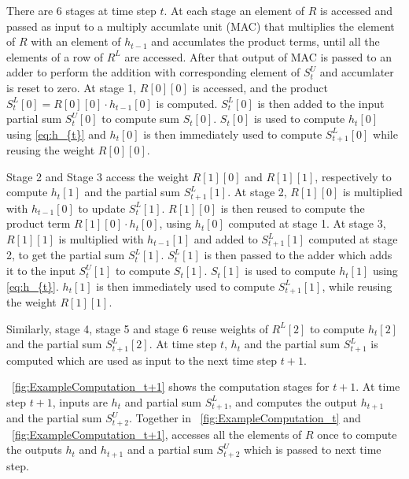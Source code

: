 There are 6 stages at time step $t$. At each stage an element of $R$ is accessed and passed as input to a multiply accumlate unit (MAC) that multiplies the element of $R$ with an element of $h_{t{-}1}$ and accumlates the product terms, until all the elements of a row of $R^L$ are accessed. After that output of MAC is passed to an adder to perform the addition with corresponding element of $S^U_{t}$ and accumlater is reset to zero. At stage 1, $R[0][0]$ is accessed, and the product $S^L_t[0]{=}R[0][0]{\cdot}h_{t{-}1}[0]$ is computed. $S^L_t[0]$ is then added to the input partial sum $S^U_t[0]$ to compute sum $S_t[0]$. $S_t[0]$ is used to compute $h_t[0]$ using \eqref{eq:h_{t}} and $h_t[0]$ is then immediately used to compute $S^L_{t{+}1}[0]$ while reusing the weight $R[0][0]$. 

Stage 2 and Stage 3 access the weight $R[1][0]$ and $R[1][1]$, respectively to compute $h_t[1]$ and the partial sum $S^L_{t{+}1}[1]$. At stage 2, $R[1][0]$ is multiplied with $h_{t{-}1}[0]$ to update $S^L_t[1]$. $R[1][0]$ is then reused to compute the product term $R[1][0]{\cdot}h_t[0]$, using $h_t[0]$ computed at stage 1. At stage 3, $R[1][1]$ is multiplied with $h_{t{-}1}[1]$ and added to $S^L_{t{+}1}[1]$ computed at stage 2, to get the partial sum $S^L_t[1]$. $S^L_t[1]$ is then passed to the adder which adds it to the input $S^U_t[1]$ to compute $S_t[1]$. $S_t[1]$ is used to compute $h_t[1]$ using \eqref{eq:h_{t}}. $h_t[1]$ is then immediately used to compute $S^L_{t{+}1}[1]$, while reusing the weight $R[1][1]$.

Similarly, stage 4, stage 5 and stage 6 reuse weights of $R^L[2]$ to compute $h_t[2]$ and the partial sum $S^L_{t{+}1}[2]$. At time step $t$, $h_t$ and the partial sum $S^L_{t{+}1}$ is computed which are used as input to the next time step $t{+}1$.
 
\figurename{~\ref{fig:ExampleComputation_t+1}} shows the computation stages for $t{+}1$. At time step $t{+}1$, inputs are $h_t$ and partial sum $S^L_{t{+}1}$, and computes the output $h_{t{+}1}$ and the partial sum $S^U_{t{+}2}$. Together in \figurename{~\ref{fig:ExampleComputation_t}} and \figurename{~\ref{fig:ExampleComputation_t+1}}, accesses all the elements of $R$ once to compute the outputs $h_t$ and $h_{t{+}1}$ and a partial sum $S^U_{t{+}2}$ which is passed to next time step. 

